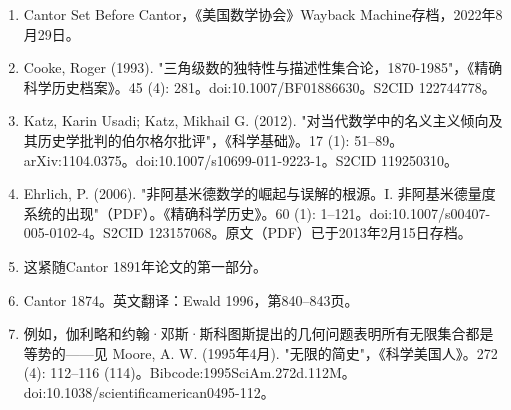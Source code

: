 \begin{enumerate}
\item Cantor Set Before Cantor，《美国数学协会》Wayback Machine存档，2022年8月29日。
\item Cooke, Roger (1993). "三角级数的独特性与描述性集合论，1870-1985"，《精确科学历史档案》。45 (4): 281。doi:10.1007/BF01886630。S2CID 122744778。
\item Katz, Karin Usadi; Katz, Mikhail G. (2012). "对当代数学中的名义主义倾向及其历史学批判的伯尔格尔批评"，《科学基础》。17 (1): 51–89。arXiv:1104.0375。doi:10.1007/s10699-011-9223-1。S2CID 119250310。
\item Ehrlich, P. (2006). "非阿基米德数学的崛起与误解的根源。I. 非阿基米德量度系统的出现"（PDF）。《精确科学历史》。60 (1): 1–121。doi:10.1007/s00407-005-0102-4。S2CID 123157068。原文（PDF）已于2013年2月15日存档。
\item 这紧随Cantor 1891年论文的第一部分。
\item Cantor 1874。英文翻译：Ewald 1996，第840–843页。
\item 例如，伽利略和约翰·邓斯·斯科图斯提出的几何问题表明所有无限集合都是等势的——见 Moore, A. W. (1995年4月). "无限的简史"，《科学美国人》。272 (4): 112–116 (114)。Bibcode:1995SciAm.272d.112M。doi:10.1038/scientificamerican0495-112。


\end{enumerate}
